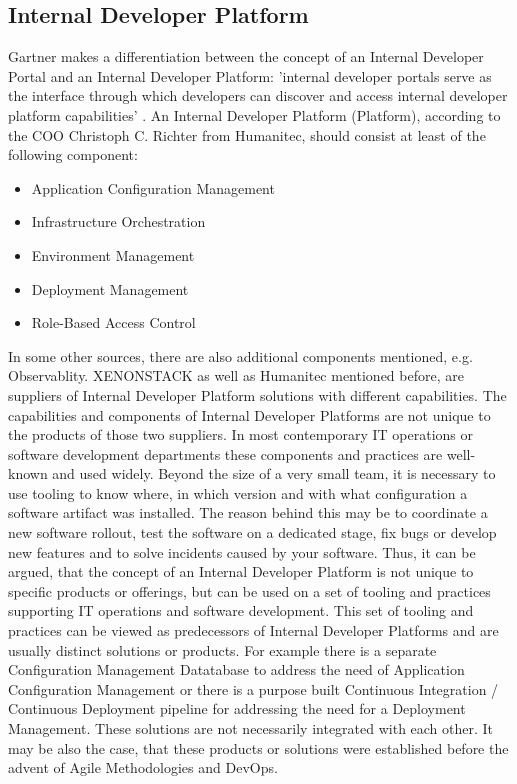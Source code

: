 \documentclass[a4paper,12pt]{article}
\begin{document}
    \subsection{Internal Developer Platform}
    Gartner makes a differentiation between the concept of an Internal Developer Portal and an Internal Developer Platform:
    'internal developer portals serve as the interface through which developers can discover and
    access internal developer platform capabilities' \parencite{gartner}.
    An Internal Developer Platform (Platform), according to the COO Christoph C. Richter from Humanitec\parencite{richteretal},
    should consist at least of the following component:
    \begin{itemize}
        \item Application Configuration Management
        \item Infrastructure Orchestration
        \item Environment Management
        \item Deployment Management
        \item Role-Based Access Control
    \end{itemize}
    In some other sources, there are also additional components mentioned, e.g. Observablity\parencite{xenon}.
    XENONSTACK as well as Humanitec mentioned before, are suppliers of Internal Developer Platform solutions with
    different capabilities.
    The capabilities and components of Internal Developer Platforms are not unique to the products of those two suppliers.
    In most contemporary IT operations or software development departments these components and practices are well-known
    and used widely.
    Beyond the size of a very small team, it is necessary to use tooling to know where, in which version and with what
    configuration a software artifact was installed.
    The reason behind this may be to coordinate a new software rollout, test the software on a dedicated stage, fix bugs
    or develop new features and to solve incidents caused by your software.
    Thus, it can be argued, that the concept of an Internal Developer Platform is not unique to specific products
    or offerings, but can be used on a set of tooling and practices supporting IT operations and software development.
    This set of tooling and practices can be viewed as predecessors of Internal Developer Platforms and are usually
    distinct solutions or products.
    For example there is a separate Configuration Management Datatabase
    to address the need of Application Configuration Management or there is a purpose built Continuous Integration /
    Continuous Deployment pipeline for addressing the need for a Deployment Management.
    These solutions are not necessarily integrated with each other.
    It may be also the case, that these
    products or solutions were established before the advent of Agile Methodologies and DevOps.
\end{document}
